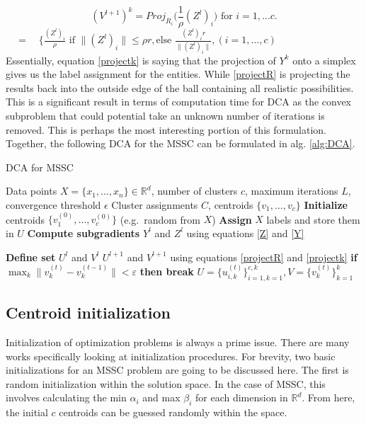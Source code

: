 \begin{equation}
(V^{l+1})^k= Proj_{R_i}\bigr(\frac{1}{\rho}(Z^l)_i) \text {  for  } i=1,...c. 
\label{projectR}
\end{equation}
$\quad =\quad \bigg\{\frac{(Z^l)_i}{\rho} \text{ if } \|(Z^l)_i\| \le \rho r, \text{else }\frac{(Z^l)_ir}{ \|(Z^l)_i\|}, (i=1,...,c) $
\\

\noindent Essentially, equation \ref{projectk} is saying that the projection of $Y^k$ onto a simplex gives us the label assignment for the entities. While \ref{projectR} is projecting the results back into the outside edge of the ball containing all realistic possibilities. This is a significant result in terms of computation time for DCA as the convex subproblem that could potential take an unknown number of iterations is removed. This is perhaps the most interesting portion of this formulation. Together, the following DCA for the MSSC can be formulated in alg. \ref{alg:DCA}. 
\begin{algorithm}[ht]
\caption{DCA for MSSC}
\label{alg:DCA}
\begin{algorithmic}[1]
\REQUIRE Data points $X = \{x_1, \ldots, x_n\}\in\mathbb{R}^d$, number of clusters $c$, maximum iterations $L$, convergence threshold $\epsilon$
\ENSURE Cluster assignments $C$, centroids $\{v_1,\dots,v_c\}$
\STATE \textbf{Initialize} centroids $\{v_1^{(0)},\dots,v_c^{(0)}\}$ (e.g.\ random from $X$)
\textbf{Assign}  $X$ labels and store them in $U$ 
  \STATE \textbf{Compute subgradients} 
  \STATE $Y^l$ and $Z^l$ using equations \ref{Z} and \ref{Y}
  
  
  
  \STATE \textbf{Define set} 
  \STATE $U^l$ and $V^l$ $U^{l+1}$ and $V^{l+1}$ using equations \ref{projectR} and \ref{projectk} 
    \hspace*{1em} \textbf{if} $\max_k \|v_k^{(t)} - v_k^{(t-1)}\| < \varepsilon$ \textbf{then break}
\ENDFOR
\RETURN $U = \{u_{i,k}^{(t)}\}_{i=1,k=1}^{c,k} ,V =\{v_k^{(t)}\}_{k=1}^k$
\end{algorithmic}
\end{algorithm}

\subsection{Centroid initialization}
Initialization of optimization problems is always a prime issue. There are many works specifically looking at initialization procedures. For brevity, two basic initializations for an MSSC problem are going to be discussed here.
The first is random initialization within the solution space. In the case of MSSC, this involves calculating the min $\alpha_i$ and max $\beta_i$ for each dimension in $\mathbb{R}^d$. From here, the initial $c$ centroids can be guessed randomly within the space.

